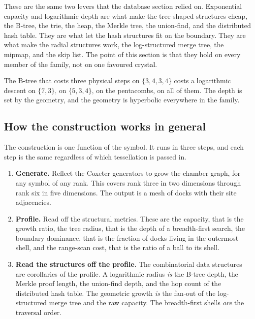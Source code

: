These are the same two levers that the database section relied on. Exponential capacity and logarithmic depth are what make the tree-shaped structures cheap, the B-tree, the trie, the heap, the Merkle tree, the union-find, and the distributed hash table. They are what let the hash structures fit on the boundary. They are what make the radial structures work, the log-structured merge tree, the mipmap, and the skip list. The point of this section is that they hold on every member of the family, not on one favoured crystal.

\begin{principle}
The B-tree that costs three physical steps on $\{3,4,3,4\}$ costs a logarithmic descent on $\{7,3\}$, on $\{5,3,4\}$, on the pentacombs, on all of them. The depth is set by the geometry, and the geometry is hyperbolic everywhere in the family.
\end{principle}

\subsection{How the construction works in general}

The construction is one function of the symbol. It runs in three steps, and each step is the same regardless of which tessellation is passed in.

\begin{enumerate}
\item \textbf{Generate.} Reflect the Coxeter generators to grow the chamber graph, for any symbol of any rank. This covers rank three in two dimensions through rank six in five dimensions. The output is a mesh of docks with their site adjacencies.
\item \textbf{Profile.} Read off the structural metrics. These are the capacity, that is the growth ratio, the tree radius, that is the depth of a breadth-first search, the boundary dominance, that is the fraction of docks living in the outermost shell, and the range-scan cost, that is the ratio of a ball to its shell.
\item \textbf{Read the structures off the profile.} The combinatorial data structures are corollaries of the profile. A logarithmic radius \emph{is} the B-tree depth, the Merkle proof length, the union-find depth, and the hop count of the distributed hash table. The geometric growth \emph{is} the fan-out of the log-structured merge tree and the raw capacity. The breadth-first shells \emph{are} the traversal order.
\end{enumerate}

